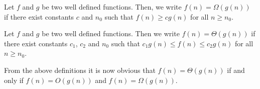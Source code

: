 	\begin{definition}
		Let $f$ and $g$ be two well defined functions. Then, we write $f(n) = \Omega(g(n))$ if there exist constants $c$ and $n_0$ such that $f(n)\ge cg(n)$ for all $n\ge n_0$.
	\end{definition}
	\begin{definition}
		Let $f$ and $g$ be two well defined functions. Then we write $f(n) = \Theta(g(n))$ if there exist constants $c_1$, $c_2$ and $n_0$ such that $c_1g(n)\le f(n)\le c_2g(n)$ for all $n\ge n_0$.
	\end{definition}
	From the above definitions it is now obvious that $f(n) = \Theta(g(n))$ if and only if $f(n) = O(g(n))$ and $f(n) = \Omega(g(n))$.
